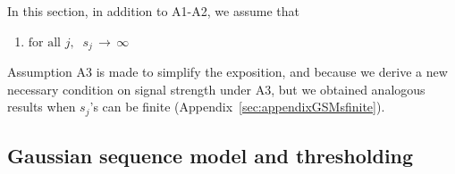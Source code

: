 \documentclass[aos]{imsart}
\theoremstyle{plain}
\begin{document}
In this section, in addition to A1-A2, we assume that
\begin{enumerate}[start=3,label={(A\arabic*)}]
    \item $\text{for all } j, \;\; s_j \,\to \, \infty$
\end{enumerate}
Assumption A3 is made to simplify the exposition, and because we derive a new necessary condition on signal strength under A3, but we obtained analogous results when $s_j$'s can be finite (Appendix~\ref{sec:appendixGSMsfinite}).

\subsection{Gaussian sequence model and thresholding}\label{sec:GSMgen}
\end{document}

